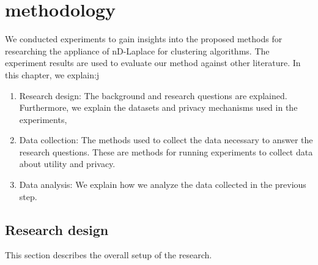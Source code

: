 \chapter{ methodology}  \label{chapter:methodology}
We conducted experiments to gain insights into the proposed methods for researching the appliance of nD-Laplace for clustering algorithms.
The experiment results are used to evaluate our method against other literature.
In this chapter, we explain:j
\begin{enumerate}
    \item Research design: The background and research questions are explained.
          Furthermore, we explain the datasets and privacy mechanisms used in the experiments, 
    \item Data collection: The methods used to collect the data necessary to answer the research questions.
          These are methods for running experiments to collect data about utility and privacy.
    \item Data analysis: We explain how we analyze the data collected in the previous step.
\end{enumerate}

\section{Research design}
This section describes the overall setup of the research.

